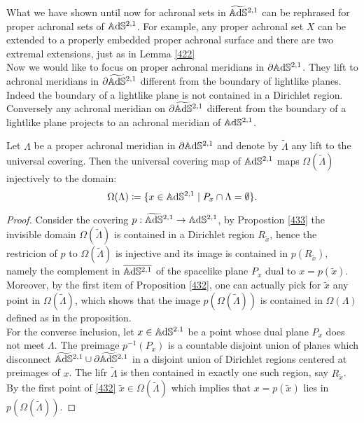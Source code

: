 What we have shown until now for achronal sets in $\widetilde{\mathbb{A}\mathrm{d}\mathbb{S}}{}^{2,1}$ can be rephrased for proper achronal sets of $\mathbb{A}\mathrm{d}\mathbb{S}^{2,1}$. For example, any proper achronal set $X$ can be extended to a properly embedded proper achronal surface and there are two extremal extensions, just as in Lemma \ref{422}\\
Now we would like to focus on proper achronal meridians in $\partial\mathbb{A}\mathrm{d}\mathbb{S}^{2,1}$. They lift to achronal meridians in $\partial\widetilde{\mathbb{A}\mathrm{d}\mathbb{S}}{}^{2,1}$ different from the boundary of lightlike planes. Indeed the boundary of a lightlike plane is not contained in a Dirichlet region. Conversely any achronal meridian on $\partial\widetilde{\mathbb{A}\mathrm{d}\mathbb{S}}{}^{2,1}$ different from the boundary of a lightlike plane projects to an achronal meridian of $\mathbb{A}\mathrm{d}\mathbb{S}^{2,1}$.

\begin{proposition}\label{453}
    Let $\Lambda$ be a proper achronal meridian in $\partial\mathbb{A}\mathrm{d}\mathbb{S}^{2,1}$ and denote by $\widetilde{\Lambda}$ any lift to the universal covering. Then the universal covering map of $\mathbb{A}\mathrm{d}\mathbb{S}^{2,1}$ maps $\Omega(\widetilde{\Lambda})$ injectively to the domain: 
    \[
        \Omega(\Lambda)\coloneqq \{x\in\mathbb{A}\mathrm{d}\mathbb{S}^{2,1}\;|\;P_x\cap\Lambda=\emptyset\}.
    \]
\end{proposition}
    
\begin{proof}
Consider the covering $p:\widetilde{\mathbb{A}\mathrm{d}\mathbb{S}}{}^{2,1}\to \mathbb{A}\mathrm{d}\mathbb{S}^{2,1}$, by Propostion \ref{433} the invisible domain $\Omega(\widetilde{\Lambda})$ is contained in a Dirichlet region $R_{\widetilde{x}}$, hence the restricion of $p$ to $\Omega(\widetilde{\Lambda})$ is injective and its image is contained in $p(R_{\widetilde{x}}),$ namely the complement in $\overline{\mathbb{A}\mathrm{d}\mathbb{S}^{2,1}}$ of the spacelike plane $P_x$ dual to $x=p(\widetilde{x})$. Moreover, by the first item of Proposition \ref{432}, one can actually pick for $\widetilde{x}$ any point in $\Omega(\widetilde{\Lambda})$, which shows that the image $p(\Omega(\widetilde{\Lambda}))$ is contained in $\Omega(\Lambda)$ defined as in the proposition. \\ 
For the converse inclusion, let $x\in\mathbb{A}\mathrm{d}\mathbb{S}^{2.1}$ be a point whose dual plane $P_x$ does not meet $\Lambda$. The preimage $p^{-1}(P_x)$ is a countable disjoint union of planes which disconnect $\widetilde{\mathbb{A}\mathrm{d}\mathbb{S}}{}^{2,1}\cup \partial\widetilde{\mathbb{A}\mathrm{d}\mathbb{S}}{}^{2,1}$ in a disjoint union of Dirichlet regions centered at preimages of $x$. The lifr $\widetilde{\Lambda}$ is then contained in exactly one such region, say $R_{\widetilde{x}}$. By the first point of \ref{432} $\widetilde{x}\in\Omega(\widetilde{\Lambda})$ which implies that   $x=p(\widetilde{x})$ lies in $p(\Omega(\widetilde{\Lambda}))$. 
\end{proof}


